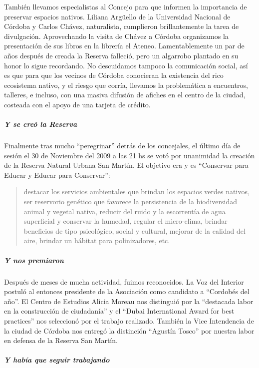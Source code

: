 \documentclass[
]{article}
\begin{document}
También llevamos especialistas al Concejo para que informen la
importancia de preservar espacios nativos. Liliana Argüello de la
Universidad Nacional de Córdoba y Carlos Chávez, naturalista, cumplieron
brillantemente la tarea de divulgación. Aprovechando la visita de Chávez
a Córdoba organizamos la presentación de sus libros en la librería el
Ateneo. Lamentablemente un par de años después de creada la Reserva
falleció, pero un algarrobo plantado en su honor lo sigue recordando. No
descuidamos tampoco la comunicación social, así es que para que los
vecinos de Córdoba conocieran la existencia del rico ecosistema nativo,
y el riesgo que corría, llevamos la problemática a encuentros, talleres,
e incluso, con una masiva difusión de afiches en el centro de la ciudad,
costeada con el apoyo de una tarjeta de crédito.

\hypertarget{y-se-creuxf3-la-reserva}{%
\subparagraph{Y se creó la Reserva}\label{y-se-creuxf3-la-reserva}}

Finalmente tras mucho ``peregrinar'' detrás de los concejales, el último
día de sesión el 30 de Noviembre del 2009 a las 21 hs se votó por
unanimidad la creación de la Reserva Natural Urbana San Martín. El
objetivo era y es ``Conservar para Educar y Educar para Conservar'':

\begin{quote}
destacar los servicios ambientales que brindan los espacios verdes
nativos, ser reservorio genético que favorece la persistencia de la
biodiversidad animal y vegetal nativa, reducir del ruido y la
escorrentía de agua superficial y conservar la humedad, regular el
micro-clima, brindar beneficios de tipo psicológico, social y cultural,
mejorar de la calidad del aire, brindar un hábitat para polinizadores,
etc.
\end{quote}

\hypertarget{y-nos-premiaron}{%
\subparagraph{Y nos premiaron}\label{y-nos-premiaron}}

Después de meses de mucha actividad, fuimos reconocidos. La Voz del
Interior postuló al entonces presidente de la Asociación como candidato
a ``Cordobés del año''. El Centro de Estudios Alicia Moreau nos
distinguió por la ``destacada labor en la construcción de ciudadanía'' y
el ``Dubai International Award for best practices'' nos seleccionó por
el trabajo realizado. También la Vice Intendencia de la ciudad de
Córdoba nos entregó la distinción ``Agustín Tosco'' por nuestra labor en
defensa de la Reserva San Martín.

\hypertarget{y-habuxeda-que-seguir-trabajando}{%
\subparagraph{Y había que seguir
trabajando}\label{y-habuxeda-que-seguir-trabajando}}
\end{document}
